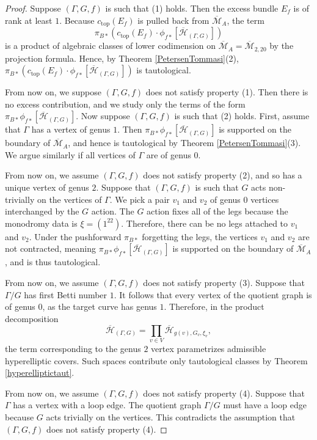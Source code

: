 \documentclass[10pt,a4paper]{amsart}
\newcommand{\Hb}{\overline{\mathcal{H}}}
\newcommand{\Mb}{\overline{\M}}
\newcommand{\M}{\mathcal{M}}
\begin{document}
\begin{proof}
    Suppose $(\Gamma,G,f)$ is such that (1) holds. Then the excess bundle $E_f$ is of rank at least $1$. Because $c_{\mathrm{top}}(E_f)$ is pulled back from $\Mb_{A}$, the term
    \[
    \pi_{B*}\left(c_{\mathrm{top}}(E_f)\cdot \phi_{f*}[\Hb_{(\Gamma,G)}]\right)
    \]
    is a product of algebraic classes of lower codimension on $\Mb_{A}=\Mb_{2,20}$ by the projection formula. Hence, by Theorem \ref{PetersenTommasi}(2), $\pi_{B*}\left(c_{\mathrm{top}}(E_f)\cdot \phi_{f*}[\Hb_{(\Gamma,G)}]\right)$ is tautological. 
    
    From now on, we suppose $(\Gamma,G,f)$ does not satisfy property (1). Then there is no excess contribution, and we study only the terms of the form $\pi_{B*}\phi_{f*}[\Hb_{(\Gamma,G)}]$. Now suppose $(\Gamma,G,f)$ is such that (2) holds. First, assume that $\Gamma$ has a vertex of genus $1$. Then $\pi_{B*}\phi_{f*}[\Hb_{(\Gamma,G)}]$ is supported on the boundary of $\Mb_{A}$, and hence is tautological by Theorem \ref{PetersenTommasi}(3). We argue similarly if all vertices of $\Gamma$ are of genus $0$.

    From now on, we assume $(\Gamma,G,f)$ does not satisfy property (2), and so has a unique vertex of genus $2$. Suppose that $(\Gamma,G,f)$ is such that $G$ acts non-trivially on the vertices of $\Gamma$. We pick a pair $v_1$ and $v_2$ of genus $0$ vertices interchanged by the $G$ action. The $G$ action fixes all of the legs because the monodromy data is $\xi=(1^{22})$. Therefore, there can be no legs attached to $v_1$ and $v_2$. Under the pushforward $\pi_{B*}$ forgetting the legs, the vertices $v_1$ and $v_2$ are not contracted, meaning $\pi_{B*}\phi_{f*}[\Hb_{(\Gamma,G)}]$ is supported on the boundary of $\Mb_{A}$, and is thus tautological.

    From now on, we assume $(\Gamma,G,f)$ does not satisfy property (3). Suppose that $\Gamma/G$ has first Betti number $1$. It follows that every vertex of the quotient graph is of genus $0$, as the target curve has genus $1$. Therefore, in the product decomposition 
    \[
    \Hb_{(\Gamma,G)}=\prod_{v\in V} \Hb_{g(v),G_v,\xi_v},
    \]
    the term corresponding to the genus $2$ vertex parametrizes admissible hyperelliptic covers. Such spaces contribute only tautological classes by Theorem \ref{hyperelliptictaut}. 
    
    From now on, we assume $(\Gamma,G,f)$ does not satisfy property (4). Suppose that $\Gamma$ has a vertex with a loop edge. The quotient graph $\Gamma/G$ must have a loop edge because $G$ acts trivially on the vertices. This contradicts the assumption that $(\Gamma,G,f)$ does not satisfy property (4). 


\end{proof}
\end{document}
